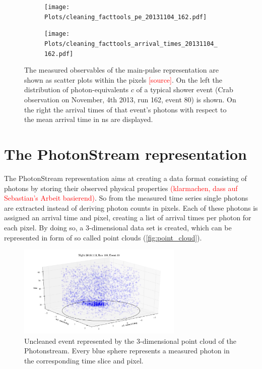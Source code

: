 \begin{figure}
  \begin{subfigure}{0.475\textwidth}
    \texttt{[image: Plots/cleaning\_facttools\_pe\_20131104\_162.pdf]}
  \end{subfigure}
  \begin{subfigure}{0.475\textwidth}
    \texttt{[image: Plots/cleaning\_facttools\_arrival\_times\_20131104\_162.pdf]}
  \end{subfigure}
  \caption{The measured observables of the main-pulse representation are shown as scatter plots within the pixels \textcolor{red}{[source]}. On the left the distribution of photon-equivalents $c$ of a typical shower event (Crab observation on November, 4th 2013, run 162, event 80) is shown. On the right the arrival times of that event's photons with respect to the mean arrival time in ns are displayed.}
  \label{fig:mainpulse}
\end{figure}

\section{The PhotonStream representation}
\label{sec:phs}
%
The PhotonStream representation aims at creating a data format consisting of photons by storing their observed physical properties \textcolor{red}{(klarmachen, dass auf Sebastian's Arbeit basierend)}. So from the measured time series single photons are extracted instead of deriving photon counts in pixels. Each of these photons is assigned an arrival time and pixel, creating a list of arrival times per photon for each pixel. By doing so, a 3-dimensional data set is created, which can be represented in form of so called point clouds (\autoref{fig:point_cloud}).
%
\begin{figure}
  \centering
  \includegraphics[width=0.7\textwidth]{Plots/event2.png}
  \caption{Uncleaned event represented by the 3-dimensional point cloud of the Photonstream. Every blue sphere represents a measured photon in the corresponding time slice and pixel.}
  \label{fig:point_cloud}
\end{figure}
%
